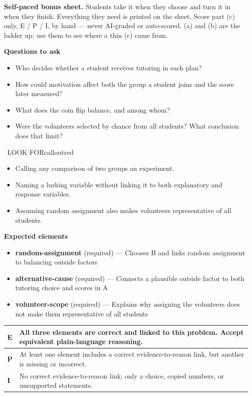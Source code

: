 \documentclass[11pt]{article}
\begin{document}
\textbf{Self-paced bonus sheet.} Students take it when they choose and turn it in when they finish. Everything they need is printed on the sheet. Score part (c) only, E / P / I, by hand --- never AI-graded or auto-scored. (a) and (b) are the ladder up; use them to see where a thin (c) came from.\par

\textbf{Questions to ask}
\begin{itemize}[leftmargin=1.5em,itemsep=2pt,topsep=2pt]
  \item Who decides whether a student receives tutoring in each plan?
  \item How could motivation affect both the group a student joins and the score later measured?
  \item What does the coin flip balance, and among whom?
  \item Were the volunteers selected by chance from all students? What conclusion does that limit?
\end{itemize}

\begin{callout}{\IconWarn\ LOOK FOR}{calloutred}
\begin{itemize}[leftmargin=1.5em,itemsep=2pt,topsep=2pt]
  \item Calling any comparison of two groups an experiment.
  \item Naming a lurking variable without linking it to both explanatory and response variables.
  \item Assuming random assignment also makes volunteers representative of all students.
\end{itemize}
\end{callout}


\textbf{Expected elements}
\begin{itemize}[leftmargin=1.5em,itemsep=2pt,topsep=2pt]
  \item \textbf{random-assignment} (required) --- Chooses B and links random assignment to balancing outside factors
  \item \textbf{alternative-cause} (required) --- Connects a plausible outside factor to both tutoring choice and scores in A
  \item \textbf{volunteer-scope} (required) --- Explains why assigning the volunteers does not make them representative of all students
\end{itemize}

{\small\renewcommand{\arraystretch}{1.25}
\noindent\begin{tabular}{|p{0.5in}|p{5.9in}|}
\hline
\textbf{E} & All three elements are correct and linked to this problem. Accept equivalent plain-language reasoning. \\ \hline
\textbf{P} & At least one element includes a correct evidence-to-reason link, but another is missing or incorrect. \\ \hline
\textbf{I} & No correct evidence-to-reason link; only a choice, copied numbers, or unsupported statements. \\ \hline
\end{tabular}}
\end{document}
